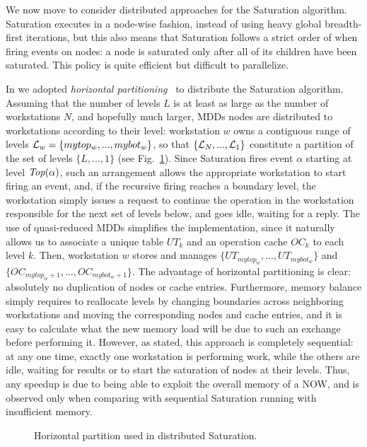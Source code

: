 \documentclass[copyright,creativecommons]{eptcs}
\newcommand{\Top}{\id{Top}} \newcommand{\Bot}{\id{Bot}}
\newcommand{\CENTERPSSCALE}[2]{\begin{center}\mbox{\epsfig{file=#1.eps, scale=#2}}\end{center}}
\begin{document}
We now move to consider distributed approaches for the Saturation algorithm.
Saturation executes in a node-wise fashion, instead of
using heavy global breadth-first iterations, but this also means that
Saturation follows a strict order of when firing events on nodes:
a node is saturated only after all of its children have been saturated.
This policy is quite efficient but difficult to parallelize.

In \cite{2004QEST-Distributed} we adopted
\emph{horizontal partitioning}~\cite{Ranjan1996}
to distribute the Saturation algorithm.
Assuming that the number of levels $L$ is at least as large as the number
of workstations $N$, and hopefully much larger,
MDDs nodes are distributed to workstations according to their level:
workstation $w$ owns a contiguous range of levels
$\mathcal{L}_w = \{mytop_w,...,mybot_w\}$, so that
$\{\mathcal{L}_N,...,\mathcal{L}_1\}$ constitute a partition of the set of levels
$\{L,...,1\}$ (see Fig.~\ref{FIG:pardis-hor-partition}).
Since Saturation fires event $\alpha$ starting at level $\Top(\alpha)$,
such an arrangement allows the appropriate workstation to start firing an
event, and, if the recursive firing reaches a boundary level,
the workstation simply issues a request to continue the operation in
the workstation responsible for the next set of levels below, and
goes idle, waiting for a reply.
The use of quasi-reduced \cite{Kimura1990} MDDs simplifies the implementation,
since it naturally allows us to associate a unique table $UT_k$
and an operation cache $OC_k$ to each level $k$.
Then, workstation $w$ stores and manages $\{UT_{mytop_w},...,UT_{mybot_w}\}$
and $\{OC_{mytop_w+1},...,OC_{mybot_w+1}\}$.
The advantage of horizontal partitioning is clear:
absolutely no duplication of nodes or cache entries.
Furthermore, memory balance simply requires to reallocate levels by changing
boundaries across neighboring workstations and moving the
corresponding nodes and cache entries, and it is easy to calculate what
the new memory load will be due to such an exchange before performing it.
However, as stated, this approach is completely sequential: at any one time,
exactly one workstation is performing work, while the
others are idle, waiting for results or to start the saturation of
nodes at their levels.
Thus, any speedup is due to being able to exploit
the overall memory of a NOW, and is observed only when comparing with
sequential Saturation running with insufficient memory.


\begin{figure}
\begin{center}
\CENTERPSSCALE{pardis-hor-partition}{0.74}
\end{center}
\caption{Horizontal partition used in distributed Saturation.}
\label{FIG:pardis-hor-partition}
\end{figure}
\end{document}
